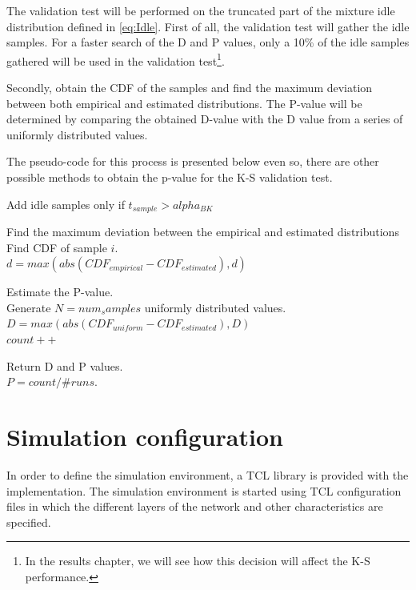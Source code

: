 The validation test will be performed on the truncated part of the mixture idle distribution defined in \ref{eq:Idle}. First of all, the validation test will gather the idle samples. For a faster search of the D and P values, only a 10\% of the idle samples gathered will be used in the validation test\footnote{In the results chapter, we will see how this decision will affect the \acs{K-S} performance.}.

Secondly, obtain the CDF of the samples and find the maximum deviation between both empirical and estimated distributions. The P-value will be determined by comparing the obtained D-value with the D value from a series of uniformly distributed values.

The pseudo-code for this process is presented below even so, there are other possible methods to obtain the p-value for the \acs{K-S} validation test.

\begin{algorithm}
\label{code:laplace}
\begin{algorithmic}
	\item[1] Add idle samples only if $t_{sample} > alpha_{BK}$
	\item[2] Find the maximum deviation between the empirical and estimated distributions
		\hspace{1.5em}  \\
			\hspace{1.5em} Find CDF of sample $i$. \\
			\hspace{1.5em} $d = max(abs(CDF_{empirical} - CDF_{estimated}), d)$
		\EndFor
	\item[3] Estimate the P-value.
		\hspace{1.5em}  \\
			\hspace{1.5em} Generate $N = num_samples$ uniformly distributed values. \\
			\hspace{1.5em} $D = max(abs(CDF_{uniform} - CDF_{estimated}), D)$
			 \\
				\hspace{1.5em} $count++$
			\EndIf
		\EndFor
	\item[4] Return D and P values. \\
		$P = count/\#runs$.				
\end{algorithmic}
\end{algorithm}

\section{Simulation configuration} \label{sec:simulation_configuration}
In order to define the simulation environment, a TCL library is provided with the \cite{marcello-thesis} implementation. The simulation environment is started using TCL configuration files in which the different layers of the network and other characteristics are specified.


